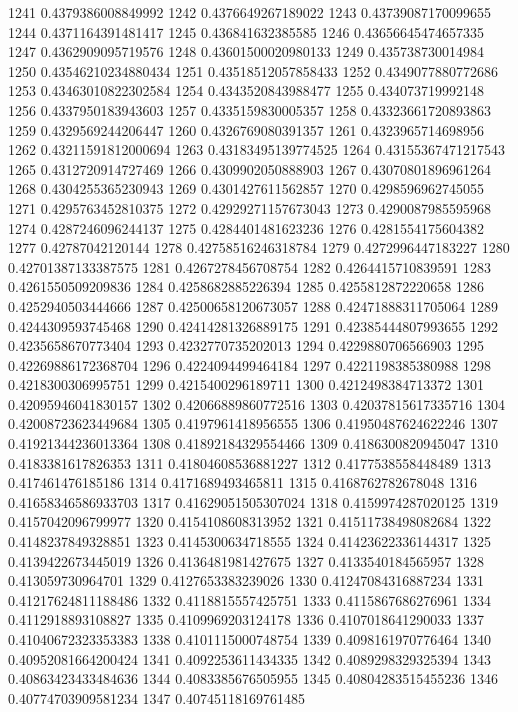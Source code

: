 1241 0.4379386008849992
1242 0.4376649267189022
1243 0.43739087170099655
1244 0.4371164391481417
1245 0.436841632385585
1246 0.43656645474657335
1247 0.4362909095719576
1248 0.43601500020980133
1249 0.435738730014984
1250 0.43546210234880434
1251 0.43518512057858433
1252 0.4349077880772686
1253 0.43463010822302584
1254 0.4343520843988477
1255 0.434073719992148
1256 0.4337950183943603
1257 0.4335159830005357
1258 0.43323661720893863
1259 0.4329569244206447
1260 0.4326769080391357
1261 0.4323965714698956
1262 0.43211591812000694
1263 0.43183495139774525
1264 0.43155367471217543
1265 0.4312720914727469
1266 0.4309902050888903
1267 0.43070801896961264
1268 0.4304255365230943
1269 0.4301427611562857
1270 0.4298596962745055
1271 0.4295763452810375
1272 0.42929271157673043
1273 0.4290087985595968
1274 0.4287246096244137
1275 0.4284401481623236
1276 0.4281554175604382
1277 0.42787042120144
1278 0.42758516246318784
1279 0.4272996447183227
1280 0.42701387133387575
1281 0.4267278456708754
1282 0.4264415710839591
1283 0.4261550509209836
1284 0.4258682885226394
1285 0.4255812872220658
1286 0.4252940503444666
1287 0.42500658120673057
1288 0.42471888311705064
1289 0.4244309593745468
1290 0.42414281326889175
1291 0.42385444807993655
1292 0.4235658670773404
1293 0.4232770735202013
1294 0.4229880706566903
1295 0.42269886172368704
1296 0.4224094499464184
1297 0.4221198385380988
1298 0.4218300306995751
1299 0.4215400296189711
1300 0.4212498384713372
1301 0.42095946041830157
1302 0.42066889860772516
1303 0.42037815617335716
1304 0.42008723623449684
1305 0.4197961418956555
1306 0.41950487624622246
1307 0.41921344236013364
1308 0.41892184329554466
1309 0.4186300820945047
1310 0.4183381617826353
1311 0.41804608536881227
1312 0.4177538558448489
1313 0.417461476185186
1314 0.4171689493465811
1315 0.4168762782678048
1316 0.41658346586933703
1317 0.41629051505307024
1318 0.4159974287020125
1319 0.4157042096799977
1320 0.4154108608313952
1321 0.41511738498082684
1322 0.4148237849328851
1323 0.4145300634718555
1324 0.41423622336144317
1325 0.4139422673445019
1326 0.4136481981427675
1327 0.4133540184565957
1328 0.413059730964701
1329 0.4127653383239026
1330 0.41247084316887234
1331 0.41217624811188486
1332 0.4118815557425751
1333 0.4115867686276961
1334 0.4112918893108827
1335 0.4109969203124178
1336 0.4107018641290033
1337 0.41040672323353383
1338 0.4101115000748754
1339 0.4098161970776464
1340 0.40952081664200424
1341 0.4092253611434335
1342 0.4089298329325394
1343 0.40863423433484636
1344 0.4083385676505955
1345 0.40804283515455236
1346 0.40774703909581234
1347 0.40745118169761485
